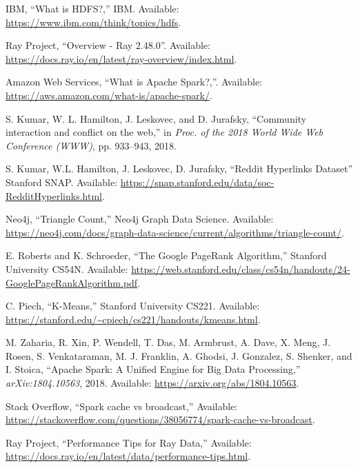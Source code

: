 \documentclass[conference]{IEEEtran}
\begin{document}
\begin{thebibliography}{00}

 IBM, ``What is HDFS?,'' IBM. Available: \url{https://www.ibm.com/think/topics/hdfs}.

 Ray Project, “Overview - Ray 2.48.0”. Available: \url{https://docs.ray.io/en/latest/ray-overview/index.html}.

 Amazon Web Services, “What is Apache Spark?,”. Available: \url{https://aws.amazon.com/what-is/apache-spark/}.

 S. Kumar, W. L. Hamilton, J. Leskovec, and D. Jurafsky, ``Community interaction and conflict on the web,'' in \textit{Proc. of the 2018 World Wide Web Conference (WWW)}, pp. 933--943, 2018.

 S. Kumar, W.L. Hamilton, J. Leskovec, D. Jurafsky, ``Reddit Hyperlinks Dataset'' Stanford SNAP. Available: \url{https://snap.stanford.edu/data/soc-RedditHyperlinks.html}.

 Neo4j, ``Triangle Count,'' Neo4j Graph Data Science. Available: \url{https://neo4j.com/docs/graph-data-science/current/algorithms/triangle-count/}.

 E. Roberts and K. Schroeder, ``The Google PageRank Algorithm,'' Stanford University CS54N. Available: \url{https://web.stanford.edu/class/cs54n/handouts/24-GooglePageRankAlgorithm.pdf}.

 C. Piech, ``K-Means,'' Stanford University CS221. Available: \url{https://stanford.edu/~cpiech/cs221/handouts/kmeans.html}.

 M. Zaharia, R. Xin, P. Wendell, T. Das, M. Armbrust, A. Dave, X. Meng, J. Rosen, S. Venkataraman, M. J. Franklin, A. Ghodsi, J. Gonzalez, S. Shenker, and I. Stoica, ``Apache Spark: A Unified Engine for Big Data Processing,'' \textit{arXiv:1804.10563}, 2018. Available: \url{https://arxiv.org/abs/1804.10563}.

 Stack Overflow, ``Spark cache vs broadcast,'' Available: \url{https://stackoverflow.com/questions/38056774/spark-cache-vs-broadcast}.

 Ray Project, ``Performance Tips for Ray Data,'' Available: \url{https://docs.ray.io/en/latest/data/performance-tips.html}.


\end{thebibliography}
\end{document}
